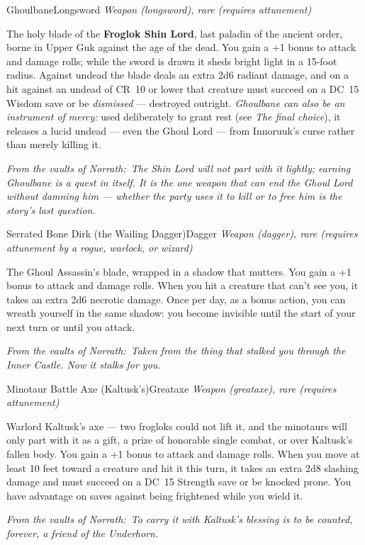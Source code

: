 \documentclass[10pt,twoside]{report}
\newcommand{\itemtype}[1]{{\itshape #1}\par\vspace{2pt}{\color{gukgold!70!black}\rule{\linewidth}{0.6pt}}\par\vspace{2pt}}
\newcommand{\eqnote}[1]{\par\vspace{3pt}{\color{gukgold!70!black}\rule{\linewidth}{0.5pt}}\par
  {\footnotesize\itshape\color{gukstone}From the vaults of Norrath:~#1}\par}
\newcommand{\dc}[1]{DC~#1}
\begin{document}
\begin{itemcard}{Ghoulbane}{Longsword}
\itemtype{Weapon (longsword), rare (requires attunement)}
The holy blade of the \textbf{Froglok Shin Lord}, last paladin of the ancient order, borne in Upper Guk against the age of the dead. You gain a +1 bonus to attack and damage rolls; while the sword is drawn it sheds bright light in a 15-foot radius. Against undead the blade deals an extra 2d6 radiant damage, and on a hit against an undead of CR~10 or lower that creature must succeed on a \dc{15} Wisdom save or be \emph{dismissed} --- destroyed outright. \emph{Ghoulbane can also be an instrument of mercy:} used deliberately to grant rest (see \textit{The final choice}), it releases a lucid undead --- even the Ghoul Lord --- from Innoruuk's curse rather than merely killing it.
\eqnote{The Shin Lord will not part with it lightly; earning Ghoulbane is a quest in itself. It is the one weapon that can end the Ghoul Lord without damning him --- whether the party uses it to kill or to free him is the story's last question.}
\end{itemcard}

\begin{itemcard}{Serrated Bone Dirk (the Wailing Dagger)}{Dagger}
\itemtype{Weapon (dagger), rare (requires attunement by a rogue, warlock, or wizard)}
The Ghoul Assassin's blade, wrapped in a shadow that mutters. You gain a +1 bonus to attack and damage rolls. When you hit a creature that can't see you, it takes an extra 2d6 necrotic damage. Once per day, as a bonus action, you can wreath yourself in the same shadow: you become invisible until the start of your next turn or until you attack.
\eqnote{Taken from the thing that stalked you through the Inner Castle. Now it stalks for you.}
\end{itemcard}

\begin{itemcard}{Minotaur Battle Axe (Kaltusk's)}{Greataxe}
\itemtype{Weapon (greataxe), rare (requires attunement)}
Warlord Kaltusk's axe --- two frogloks could not lift it, and the minotaurs will only part with it as a gift, a prize of honorable single combat, or over Kaltusk's fallen body. You gain a +1 bonus to attack and damage rolls. When you move at least 10 feet toward a creature and hit it this turn, it takes an extra 2d8 slashing damage and must succeed on a \dc{15} Strength save or be knocked prone. You have advantage on saves against being frightened while you wield it.
\eqnote{To carry it with Kaltusk's blessing is to be counted, forever, a friend of the Underhorn.}
\end{itemcard}
\end{document}
